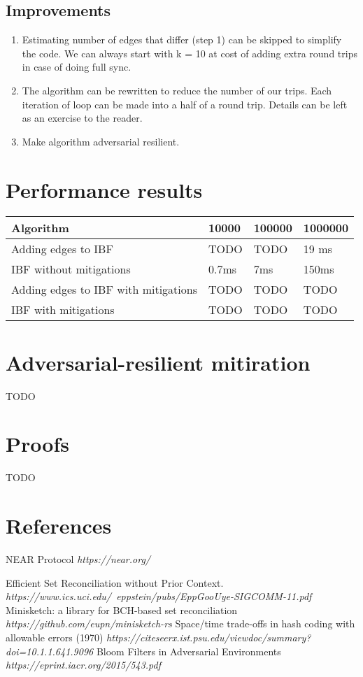\documentclass[11pt]{article}
\begin{document}
\subsection{Improvements}
\begin{enumerate}
\item Estimating number of edges that differ (step 1) can be skipped to simplify the code. We can always start with k = 10 at cost of adding extra round trips in case of doing full sync.
\item The algorithm can be rewritten to reduce the number of our trips. Each iteration of loop can be made into a half of a round trip.
Details can be left as an exercise to the reader.
\item Make algorithm adversarial resilient.
\end{enumerate}


\section{Performance results}

\begin{tabular}{ | l | l | l | l |}
    \hline
    Algorithm & 10000 & 100000 & 1000000 \\ \hline
    Adding edges to IBF & TODO & TODO & 19 ms \\
    IBF without mitigations & 0.7ms & 7ms & 150ms  \\   \hline
    Adding edges to IBF with mitigations & TODO & TODO & TODO \\
    IBF with mitigations & TODO & TODO & TODO \\ \hline
\end{tabular}

\section{Adversarial-resilient mitiration}\label{sec:mitigation}
TODO

\section{Proofs}
TODO

\section{References}

\begin{thebibliography}{9}
NEAR Protocol
\textit{https://near.org/}

Efficient Set Reconciliation without Prior Context.
\textit{https://www.ics.uci.edu/~eppstein/pubs/EppGooUye-SIGCOMM-11.pdf}
Minisketch: a library for BCH-based set reconciliation
\textit{https://github.com/eupn/minisketch-rs}
Space/time trade-offs in hash coding with allowable errors (1970)
\textit{https://citeseerx.ist.psu.edu/viewdoc/summary?doi=10.1.1.641.9096}
Bloom Filters in Adversarial Environments
\textit{https://eprint.iacr.org/2015/543.pdf}
\end{thebibliography}
\end{document}
